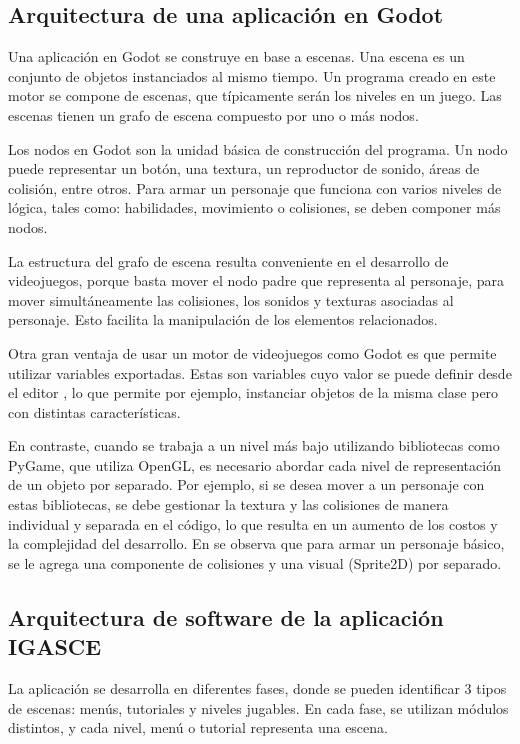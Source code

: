 \subsection{Arquitectura de una aplicación en Godot}

Una aplicación en Godot se construye en base a escenas. Una escena es un conjunto de objetos instanciados al mismo tiempo. Un programa creado en este motor se compone de escenas, que típicamente serán los niveles en un juego. Las escenas tienen un grafo de escena compuesto por uno o más nodos.

Los nodos en Godot son la unidad básica de construcción del programa. Un nodo puede representar un botón, una textura, un reproductor de sonido, áreas de colisión, entre otros. Para armar un personaje que funciona con varios niveles de lógica, tales como: habilidades, movimiento o colisiones, se deben componer más nodos.

La estructura del grafo de escena resulta conveniente en el desarrollo de videojuegos, porque basta mover el nodo padre que representa al personaje, para mover simultáneamente las colisiones, los sonidos y texturas asociadas al personaje. Esto facilita la manipulación de los elementos relacionados.

Otra gran ventaja de usar un motor de videojuegos como Godot es que permite utilizar variables exportadas. Estas son variables cuyo valor se puede definir desde el editor \cite{GodotExportVariables}, lo que permite por ejemplo, instanciar objetos de la misma clase pero con distintas características.


En contraste, cuando se trabaja a un nivel más bajo utilizando bibliotecas como PyGame, que utiliza OpenGL, es necesario abordar cada nivel de representación de un objeto por separado. Por ejemplo, si se desea mover a un personaje con estas bibliotecas, se debe gestionar la textura y las colisiones de manera individual y separada en el código, lo que resulta en un aumento de los costos y la complejidad del desarrollo. En \cite{GodotCollisionsAndRendering} se observa que para armar un personaje básico, se le agrega una componente de colisiones y una visual (Sprite2D) por separado.



\subsection{Arquitectura de software de la aplicación IGASCE}

La aplicación se desarrolla en diferentes fases, donde se pueden identificar 3 tipos de escenas: menús, tutoriales y niveles jugables. En cada fase, se utilizan módulos distintos, y cada nivel, menú o tutorial representa una escena.

